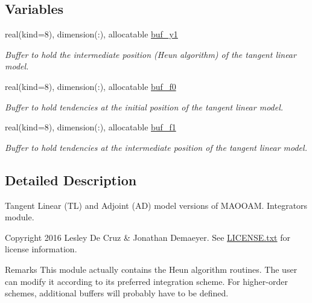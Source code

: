 \subsection*{Variables}
\begin{DoxyCompactItemize}
\item 
real(kind=8), dimension(\+:), allocatable \hyperlink{namespacerk2__tl__ad__integrator_afacb3ff63a02a9f4db66699cdca4b05b}{buf\+\_\+y1}
\begin{DoxyCompactList}\small\item\em Buffer to hold the intermediate position (Heun algorithm) of the tangent linear model. \end{DoxyCompactList}\item 
real(kind=8), dimension(\+:), allocatable \hyperlink{namespacerk2__tl__ad__integrator_ac7b0aea8c2a541e987047da9bc08ff61}{buf\+\_\+f0}
\begin{DoxyCompactList}\small\item\em Buffer to hold tendencies at the initial position of the tangent linear model. \end{DoxyCompactList}\item 
real(kind=8), dimension(\+:), allocatable \hyperlink{namespacerk2__tl__ad__integrator_a72947f0ba4ce3b9e7877af0e9c4ba13e}{buf\+\_\+f1}
\begin{DoxyCompactList}\small\item\em Buffer to hold tendencies at the intermediate position of the tangent linear model. \end{DoxyCompactList}\end{DoxyCompactItemize}


\subsection{Detailed Description}
Tangent Linear (TL) and Adjoint (AD) model versions of M\+A\+O\+O\+AM. Integrators module. 

\begin{DoxyCopyright}{Copyright}
2016 Lesley De Cruz \& Jonathan Demaeyer. See \hyperlink{LICENSE_8txt}{L\+I\+C\+E\+N\+S\+E.\+txt} for license information. 
\end{DoxyCopyright}
\begin{DoxyRemark}{Remarks}
This module actually contains the Heun algorithm routines. The user can modify it according to its preferred integration scheme. For higher-\/order schemes, additional buffers will probably have to be defined. 
\end{DoxyRemark}


